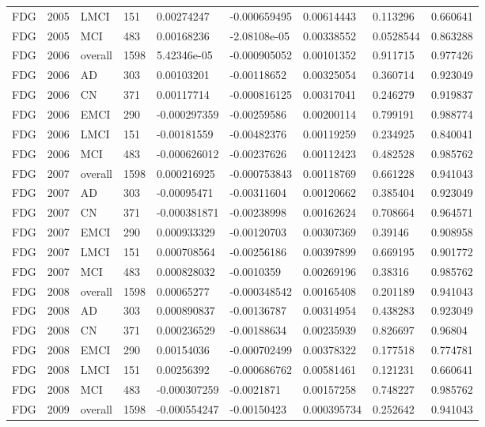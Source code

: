 \begin{landscape}
\begin{longtable}{lllllllll}
FDG & 2005 & LMCI & 151 & 0.00274247 & -0.000659495 & 0.00614443 & 0.113296 & 0.660641 \\
FDG & 2005 & MCI & 483 & 0.00168236 & -2.08108e-05 & 0.00338552 & 0.0528544 & 0.863288 \\
FDG & 2006 & overall & 1598 & 5.42346e-05 & -0.000905052 & 0.00101352 & 0.911715 & 0.977426 \\
FDG & 2006 & AD & 303 & 0.00103201 & -0.00118652 & 0.00325054 & 0.360714 & 0.923049 \\
FDG & 2006 & CN & 371 & 0.00117714 & -0.000816125 & 0.00317041 & 0.246279 & 0.919837 \\
FDG & 2006 & EMCI & 290 & -0.000297359 & -0.00259586 & 0.00200114 & 0.799191 & 0.988774 \\
FDG & 2006 & LMCI & 151 & -0.00181559 & -0.00482376 & 0.00119259 & 0.234925 & 0.840041 \\
FDG & 2006 & MCI & 483 & -0.000626012 & -0.00237626 & 0.00112423 & 0.482528 & 0.985762 \\
FDG & 2007 & overall & 1598 & 0.000216925 & -0.000753843 & 0.00118769 & 0.661228 & 0.941043 \\
FDG & 2007 & AD & 303 & -0.00095471 & -0.00311604 & 0.00120662 & 0.385404 & 0.923049 \\
FDG & 2007 & CN & 371 & -0.000381871 & -0.00238998 & 0.00162624 & 0.708664 & 0.964571 \\
FDG & 2007 & EMCI & 290 & 0.000933329 & -0.00120703 & 0.00307369 & 0.39146 & 0.908958 \\
FDG & 2007 & LMCI & 151 & 0.000708564 & -0.00256186 & 0.00397899 & 0.669195 & 0.901772 \\
FDG & 2007 & MCI & 483 & 0.000828032 & -0.0010359 & 0.00269196 & 0.38316 & 0.985762 \\
FDG & 2008 & overall & 1598 & 0.00065277 & -0.000348542 & 0.00165408 & 0.201189 & 0.941043 \\
FDG & 2008 & AD & 303 & 0.000890837 & -0.00136787 & 0.00314954 & 0.438283 & 0.923049 \\
FDG & 2008 & CN & 371 & 0.000236529 & -0.00188634 & 0.00235939 & 0.826697 & 0.96804 \\
FDG & 2008 & EMCI & 290 & 0.00154036 & -0.000702499 & 0.00378322 & 0.177518 & 0.774781 \\
FDG & 2008 & LMCI & 151 & 0.00256392 & -0.000686762 & 0.00581461 & 0.121231 & 0.660641 \\
FDG & 2008 & MCI & 483 & -0.000307259 & -0.0021871 & 0.00157258 & 0.748227 & 0.985762 \\
FDG & 2009 & overall & 1598 & -0.000554247 & -0.00150423 & 0.000395734 & 0.252642 & 0.941043 \\

\end{longtable}
\end{landscape}
